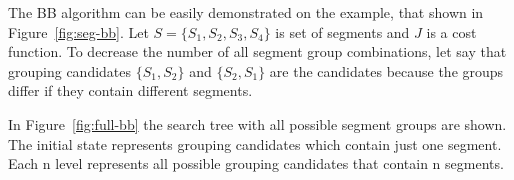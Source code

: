 \documentclass{lutmscthesis}[2010/09/22]
\begin{document}
The BB algorithm can be easily demonstrated on the example, that shown in Figure~\ref{fig:seg-bb}. Let $S=\{S_1,S_2,S_3,S_4\}$ is set of segments and $J$ is a cost function. To decrease the number of all segment group combinations, let say that grouping candidates $\{S_1,S_2\}$ and $\{S_2,S_1\}$ are the candidates because the groups differ if they contain different segments. 


\begin{figure}[htp]
\end{figure}

In Figure~\ref{fig:full-bb} the search tree with all possible segment groups are shown.  The initial state represents grouping candidates which contain just one segment. Each n level represents all possible grouping candidates that contain n segments.   




\begin{figure}[htp]
\end{figure}
\end{document}
